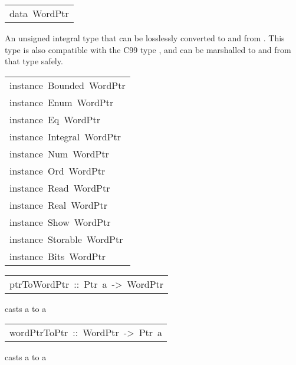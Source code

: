 \begin{haddockdesc}
\item[\begin{tabular}{@{}l}
data\ WordPtr
\end{tabular}]\haddockbegindoc
An unsigned integral type that can be losslessly converted to and from
 . This type is also compatible with the C99 type , and
 can be marshalled to and from that type safely.
\par

\end{haddockdesc}
\begin{haddockdesc}
\item[\begin{tabular}{@{}l}
instance\ Bounded\ WordPtr\\instance\ Enum\ WordPtr\\instance\ Eq\ WordPtr\\instance\ Integral\ WordPtr\\instance\ Num\ WordPtr\\instance\ Ord\ WordPtr\\instance\ Read\ WordPtr\\instance\ Real\ WordPtr\\instance\ Show\ WordPtr\\instance\ Storable\ WordPtr\\instance\ Bits\ WordPtr
\end{tabular}]
\end{haddockdesc}
\begin{haddockdesc}
\item[\begin{tabular}{@{}l}
ptrToWordPtr\ ::\ Ptr\ a\ ->\ WordPtr
\end{tabular}]\haddockbegindoc
casts a  to a 
\par

\end{haddockdesc}
\begin{haddockdesc}
\item[\begin{tabular}{@{}l}
wordPtrToPtr\ ::\ WordPtr\ ->\ Ptr\ a
\end{tabular}]\haddockbegindoc
casts a  to a 
\par

\end{haddockdesc}